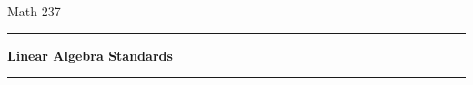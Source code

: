 \documentclass[letterpaper]{article}
\begin{document}
\pagestyle{empty}
\noindent Math 237 \hfill \sem \hfill \prof
\vspace{0.3in}
\hrule
\begin{center}{\large \bf Linear Algebra Standards}\end{center}
\hrule



\end{document}
